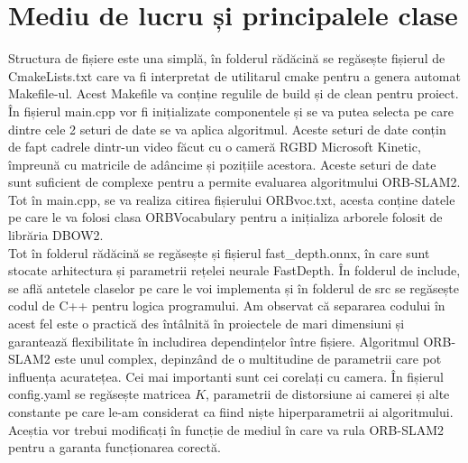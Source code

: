 \documentclass[12pt,a4paper]{report}
\begin{document}
\section{Mediu de lucru și principalele clase}
Structura de fișiere este una simplă, în folderul rădăcină se regăsește fișierul de 
CmakeLists.txt care va fi interpretat de utilitarul cmake pentru a genera automat Makefile-ul. 
Acest Makefile va conține regulile de build și de clean pentru proiect. În fișierul main.cpp
vor fi inițializate componentele și se va putea selecta pe care dintre cele 2 seturi
de date se va aplica algoritmul. Aceste seturi de date conțin de fapt cadrele dintr-un video 
făcut cu o cameră RGBD Microsoft Kinetic, împreună cu matricile de adâncime și pozițiile acestora.
Aceste seturi de date sunt suficient de complexe pentru a permite evaluarea algoritmului ORB-SLAM2.
Tot în main.cpp, se va realiza citirea fișierului ORBvoc.txt, acesta conține datele pe care le va
folosi clasa ORBVocabulary pentru a inițializa arborele folosit de librăria DBOW2. \\
Tot în folderul rădăcină se regăsește și fișierul fast\_depth.onnx, în care sunt stocate 
arhitectura și parametrii rețelei neurale FastDepth. În folderul de include, se află antetele claselor
pe care le voi implementa și în folderul de src se regăsește codul de C++ pentru logica programului.
Am observat că separarea codului în acest fel este o practică des întâlnită în proiectele de mari
dimensiuni și garantează flexibilitate în includirea dependințelor între fișiere. Algoritmul 
ORB-SLAM2 este unul complex, depinzând de o multitudine de parametrii care pot influența acuratețea.
Cei mai importanti sunt cei corelați cu camera. În fișierul config.yaml se regăsește matricea \(K\), 
parametrii de distorsiune ai camerei și alte constante pe care le-am considerat ca fiind niște
hiperparametrii ai algoritmului. Aceștia vor trebui modificați în funcție de mediul în care va 
rula ORB-SLAM2 pentru a garanta funcționarea corectă. \\
\end{document}
